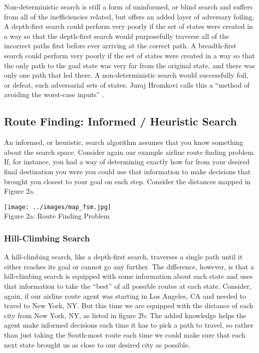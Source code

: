 Non-deterministic search is still a form of uninformed, or blind search and
suffers from all of the inefficiencies related, but offers an added layer of 
adversary foiling.  A depth-first search could perform very poorly if the set of
states were created in a way so that the depth-first search would purposefully
traverse all of the incorrect paths first before ever arriving at the correct
path.  A breadth-first search could perform very poorly if the set of states
were created in a way so that the only path to the goal state was very far from
the original state, and there was only one path that led there.  A
non-deterministic search would successfully foil, or defeat, such adversarial
sets of states. Juraj Hromkovi calls this a ``method of avoiding the
worst-case inputs'' \cite{hromkovic2005}.

\subsection{Route Finding: Informed / Heuristic Search}
An informed, or heuristic, search algorithm assumes that you know something
about the search space.  Consider again our example airline route finding
problem.  If, for instance, you had a way of determining exactly how far from
your desired final destination you were you could use that information to make
decisions that brought you closest to your goal on each step.  Consider the
distances mapped in Figure 2a.

\begin{center}
\texttt{[image: ../images/map\_fsm.jpg]}\\
Figure 2a: Route Finding Problem
\cite{winston1992}
\end{center}

\subsubsection{Hill-Climbing Search}
A hill-climbing search, like a depth-first search, traverses a single path until
it either reaches its goal or cannot go any further.  The difference,
however, is that a hill-climbing search is equipped with some information
about each state and uses that information to take the ``best'' of all
possible routes at each state.  Consider, again, if our airline route agent was
starting in Los Angeles, CA and needed to travel to New York, NY.  But this
time we are equipped with the distance of each city from New York, NY, as
listed in figure 2b.  The added knowledge helps the agent make informed
decisions each time it has to pick a path to travel, so rather than just taking
the South-most route each time we could make sure that each next state
brought us as close to our desired city as possible.

